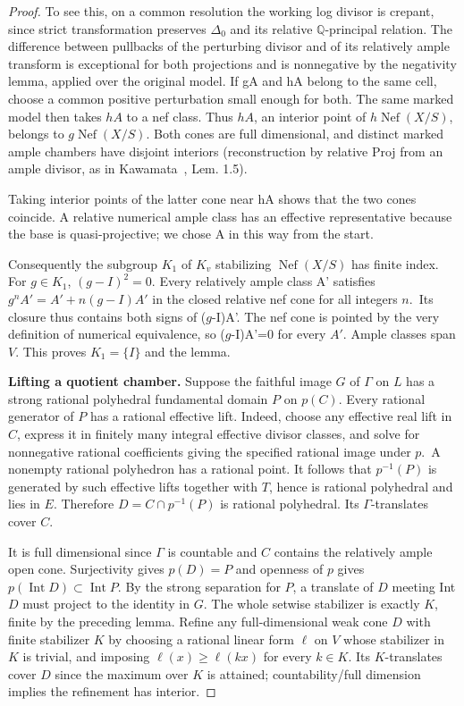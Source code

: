 \documentclass[11pt]{article}
\begin{document}
\begin{proof}
To see this, on a common resolution the working log divisor is crepant, since strict transformation
preserves \(\Delta_0\) and its relative \(\mathbb Q\)-principal relation. The difference between
pullbacks of the perturbing divisor and of its relatively ample transform is exceptional for both
projections and is nonnegative by the negativity lemma, applied over the original model. If gA and hA
belong to the same cell, choose a common positive perturbation small enough for both. The same marked
model then takes \(hA\) to a nef class. Thus \(hA\), an interior point of \(h\operatorname{Nef}(X/S)\), belongs to
\(g\operatorname{Nef}(X/S)\). Both cones are full dimensional, and distinct marked ample chambers have disjoint
interiors (reconstruction by relative Proj from an ample divisor, as in Kawamata~\cite{Kawamata}, Lem.
1.5).

Taking interior points of the latter cone near hA shows that the two cones coincide. A relative numerical
ample class has an effective representative because the base is quasi-projective; we chose A in this way
from the start.

Consequently the subgroup \(K_1\) of \(K_v\) stabilizing \(\operatorname{Nef}(X/S)\) has finite index. For
\(g\in K_1\), \((g-I)^2=0\). Every relatively ample class A' satisfies \(g^nA'=A'+n(g-I)A'\) in
the closed relative nef cone for all integers \(n\).~Its closure thus contains both signs of (\(g\)-I)A'.
The nef cone is pointed by the very definition of numerical equivalence, so (\(g\)-I)A'=0 for every \(A'\).
Ample classes span \(V\). This proves \(K_1=\{I\}\) and the lemma.

\textbf{Lifting a quotient chamber.} Suppose the faithful image \(G\) of \(\Gamma\) on \(L\) has a strong
rational polyhedral fundamental domain \(P\) on \(p(C)\). Every rational generator of \(P\) has a
rational effective lift. Indeed, choose any effective real lift in \(C\), express it in finitely many
integral effective divisor classes, and solve for nonnegative rational coefficients giving the specified
rational image under \(p\).~A nonempty rational polyhedron has a rational point. It follows that
\(p^{-1}(P)\) is generated by such effective lifts together with \(T\), hence is rational polyhedral and
lies in \(E\). Therefore \(D=C\cap p^{-1}(P)\) is rational polyhedral. Its \(\Gamma\)-translates cover
\(C\).

It is full dimensional since \(\Gamma\) is countable and \(C\) contains the relatively ample open cone.
Surjectivity gives \(p(D)=P\) and openness of \(p\) gives \(p(\operatorname{Int}D)\subset\operatorname{Int}P\).
By the strong separation for \(P\), a translate of \(D\) meeting Int \(D\) must project to the identity
in \(G\). The whole setwise stabilizer is exactly \(K\), finite by the preceding lemma. Refine any
full-dimensional weak cone \(D\) with finite stabilizer \(K\) by choosing a rational linear form \(\ell\) on \(V\)
whose stabilizer in \(K\) is trivial, and imposing \(\ell(x)\ge\ell(kx)\) for every \(k\in K\). Its
\(K\)-translates cover \(D\) since the maximum over \(K\) is attained; countability/full dimension
implies the refinement has interior.


\end{proof}
\end{document}
